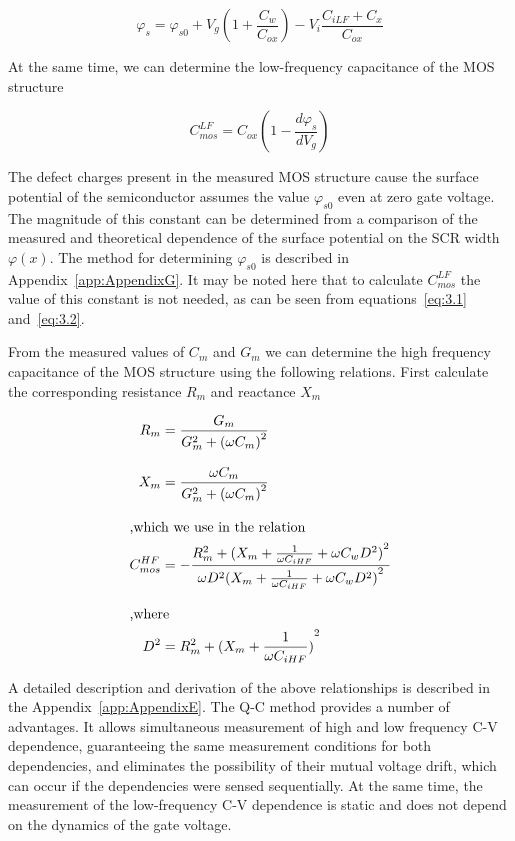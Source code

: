 \begin{equation}\label{eq:3.1}
  \varphi_s = \varphi_{s0} + V_g (1 + \frac{C_w}{C_{ox}}) - V_i \frac{C_{iLF}+C_x}{C_{ox}}
\end{equation}

At the same time, we can determine the low-frequency capacitance of
the MOS structure

\begin{equation}\label{eq:3.2}
  C^{LF}_{mos} = C_{ox} (1 - \frac{d\varphi_s}{dV_g})
\end{equation}

The defect charges present in the measured MOS structure cause the
surface potential of the semiconductor assumes the value
$\varphi_{s0}$ even at zero gate voltage. The magnitude of this
constant can be determined from a comparison of the measured and
theoretical dependence of the surface potential on the SCR width
$\varphi(x)$.  The method for determining $\varphi_{s0}$ is described
in Appendix~\ref{app:AppendixG}. It may be noted here that to
calculate $C^{LF}_{mos}$ the value of this constant is not needed, as
can be seen from equations~\ref{eq:3.1} and~\ref{eq:3.2}.

From the measured values of $C_m$ and $G_m$ we can determine the high
frequency capacitance of the MOS structure using the following
relations.  First calculate the corresponding resistance $R_m$ and
reactance $X_m$

\begin{subequations}\label{eq:3.3}
  \begin{align}
    R_m &= \frac{G_m}{G^2_m + {(\omega C_m)}^2}\label{eq:3.3a}\\[0.3cm]
    X_m &= \frac{\omega C_m}{G^2_m + {(\omega C_m)}^2}\label{eq:3.3b}\\[0.3cm]
    \intertext{,which we use in the relation}
    C^{HF}_{mos} &= - \cfrac{R^2_m + {(X_m + \frac{1}{\omega C_{iHF}} + \omega C_w D^2)}^2}{\omega D^2{(X_m + \frac{1}{\omega C_{iHF}} + \omega C_{w} D^2)}^2}\label{eq:3.3c}\\[0.3cm]
    \intertext{,where}
    D^2 &= R^2_m + {(X_m + \frac{1}{\omega C_{iHF}})}^2\label{eq:3.3d}
  \end{align}
\end{subequations}

A detailed description and derivation of the above relationships is
described in the Appendix~\ref{app:AppendixE}. The Q-C method provides
a number of advantages.  It allows simultaneous measurement of high
and low frequency C-V dependence, guaranteeing the same measurement
conditions for both dependencies, and eliminates the possibility of
their mutual voltage drift, which can occur if the dependencies were
sensed sequentially.  At the same time, the measurement of the
low-frequency C-V dependence is static and does not depend on the
dynamics of the gate voltage.


